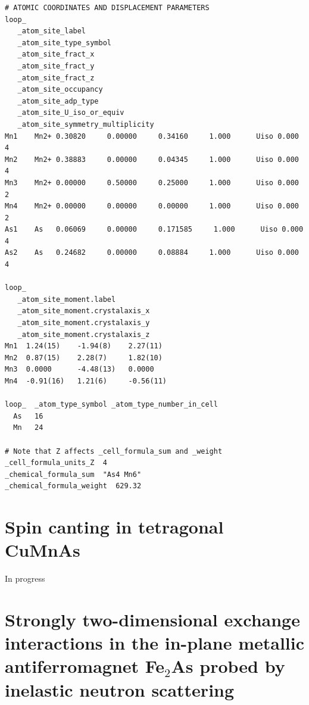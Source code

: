 \documentclass[10pt,doublespacing,edeposit]{uiucthesis2020}
\begin{document}
\begin{mainmatter}
\begin{verbatim}
# ATOMIC COORDINATES AND DISPLACEMENT PARAMETERS
loop_ 
   _atom_site_label
   _atom_site_type_symbol
   _atom_site_fract_x
   _atom_site_fract_y
   _atom_site_fract_z
   _atom_site_occupancy
   _atom_site_adp_type
   _atom_site_U_iso_or_equiv
   _atom_site_symmetry_multiplicity
Mn1    Mn2+ 0.30820     0.00000     0.34160     1.000      Uiso 0.000      4   
Mn2    Mn2+ 0.38883     0.00000     0.04345     1.000      Uiso 0.000      4   
Mn3    Mn2+ 0.00000     0.50000     0.25000     1.000      Uiso 0.000      2   
Mn4    Mn2+ 0.00000     0.00000     0.00000     1.000      Uiso 0.000      2   
As1    As   0.06069     0.00000     0.171585     1.000      Uiso 0.000      4   
As2    As   0.24682     0.00000     0.08884     1.000      Uiso 0.000      4   

loop_
   _atom_site_moment.label
   _atom_site_moment.crystalaxis_x
   _atom_site_moment.crystalaxis_y
   _atom_site_moment.crystalaxis_z
Mn1  1.24(15)    -1.94(8)    2.27(11)    
Mn2  0.87(15)    2.28(7)     1.82(10)    
Mn3  0.0000      -4.48(13)   0.0000      
Mn4  -0.91(16)   1.21(6)     -0.56(11)   

loop_  _atom_type_symbol _atom_type_number_in_cell
  As   16
  Mn   24

# Note that Z affects _cell_formula_sum and _weight
_cell_formula_units_Z  4
_chemical_formula_sum  "As4 Mn6"
_chemical_formula_weight  629.32
\end{verbatim}

\chapter{Spin canting in tetragonal CuMnAs}

In progress



\chapter{Strongly two-dimensional exchange interactions in the in-plane metallic antiferromagnet Fe$_2$As probed by inelastic neutron scattering}

\hfill \break



\end{mainmatter}
\end{document}
